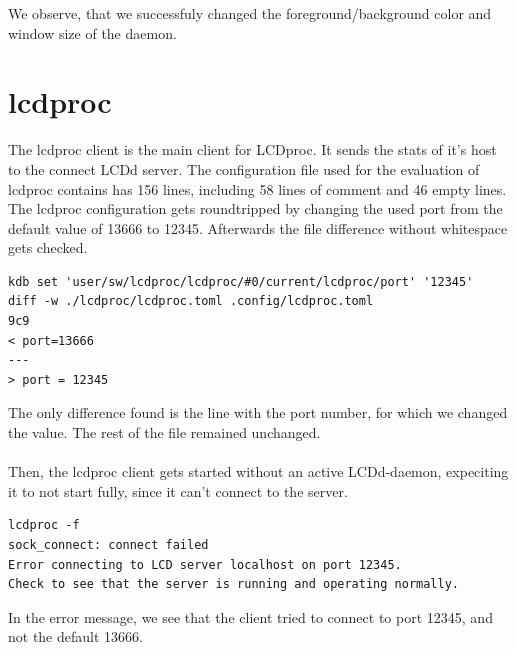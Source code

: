 \documentclass[12pt]{report}
\begin{document}
\FloatBarrier
We observe, that we successfuly changed the foreground/background color and window size of the daemon.

\section{lcdproc}
The lcdproc client is the main client for LCDproc. It sends the stats of it's host to the connect LCDd server.
The configuration file used for the evaluation of lcdproc contains has 156 lines, including 58 lines of comment and 46 empty lines.
The lcdproc configuration gets roundtripped by changing the used port from the default value of 13666 to 12345.
Afterwards the file difference without whitespace gets checked.
{\small
\begin{verbatim}
kdb set 'user/sw/lcdproc/lcdproc/#0/current/lcdproc/port' '12345'
diff -w ./lcdproc/lcdproc.toml .config/lcdproc.toml
9c9
< port=13666
---
> port = 12345
\end{verbatim}
}
The only difference found is the line with the port number, for which we changed the value.
The rest of the file remained unchanged.
\\\\
Then, the lcdproc client gets started without an active LCDd-daemon, expeciting it to not start fully, since it can't connect to the server.
{\small
\begin{verbatim}
lcdproc -f
sock_connect: connect failed
Error connecting to LCD server localhost on port 12345.
Check to see that the server is running and operating normally.
\end{verbatim}
}
In the error message, we see that the client tried to connect to port 12345, and not the default 13666.
\end{document}
